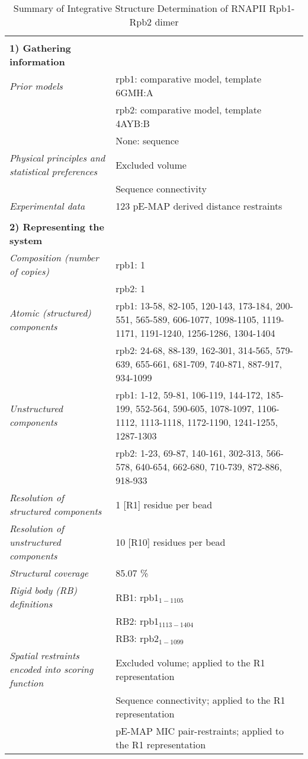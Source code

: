 \documentclass[8pt,a4paper]{article}
\begin{document}
\setcounter{table}{7}

\begin{longtable}{ p{} | p{} } 
\caption{Summary of Integrative Structure Determination of RNAPII Rpb1-Rpb2 dimer}
  
  &  \\
  \textbf{1) Gathering information} & \\
    \hline

            \textit{Prior models} & rpb1: comparative model, template 6GMH:A\\
            & rpb2: comparative model, template 4AYB:B \\
            & None: sequence  \\
                \textit{Physical principles and statistical preferences} & Excluded volume\\
            & Sequence connectivity \\
                \textit{Experimental data} & 123 pE-MAP derived distance restraints\\
          
    &  \\
    \normalsize{\textbf{2) Representing the system}} & \\
    \hline
    
            \textit{Composition (number of copies)} & rpb1: 1\\
            & rpb2: 1 \\
                \textit{Atomic (structured) components} & rpb1: 13-58, 82-105, 120-143, 173-184, 200-551, 565-589, 606-1077, 1098-1105, 1119-1171, 1191-1240, 1256-1286, 1304-1404\\
            & rpb2: 24-68, 88-139, 162-301, 314-565, 579-639, 655-661, 681-709, 740-871, 887-917, 934-1099 \\
                \textit{Unstructured components} & rpb1: 1-12, 59-81, 106-119, 144-172, 185-199, 552-564, 590-605, 1078-1097, 1106-1112, 1113-1118, 1172-1190, 1241-1255, 1287-1303\\
            & rpb2: 1-23, 69-87, 140-161, 302-313, 566-578, 640-654, 662-680, 710-739, 872-886, 918-933 \\
                \textit{Resolution of structured components} & 1 [R1] residue per bead\\
                \textit{Resolution of unstructured components} & 10 [R10] residues per bead\\
                \textit{Structural coverage} & 85.07 \%\\
                \textit{Rigid body (RB) definitions} & RB1: rpb1$_{1-1105}$\\
            & RB2: rpb1$_{1113-1404}$ \\
            & RB3: rpb2$_{1-1099}$ \\
                \textit{Spatial restraints encoded into scoring function} & Excluded volume; applied to the R1 representation\\
            & Sequence connectivity; applied to the R1 representation \\
            & pE-MAP MIC pair-restraints; applied to the R1 representation \\
        


\end{longtable}
\end{document}
